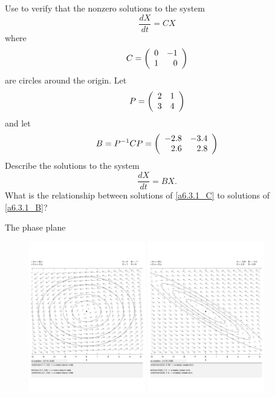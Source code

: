 \documentclass{ximera}
\begin{document}
\begin{exercise} \label{a6.3.1}
Use {\pplane} to verify that the nonzero solutions to the system
\[
\frac{dX}{dt} = CX
\]
where
\begin{equation} \label{a6.3.1_C}
C = \left(\begin{array}{rrrrrrrrrrrrrrrrrr} 0 & -1\\ 1 & 0 \end{array}\right)
\end{equation}
are circles around the origin.  Let 
\[
P = \left(\begin{array}{rrrrrrrrrrrrrrrrrr} 2 & 1\\ 3 & 4 \end{array}\right)
\]
and  let 
\[
B = P^{-1}CP =  \left(\begin{array}{rrrrrrrrrrrrrrrrrr} -2.8 & -3.4\\ 2.6 & 2.8 \end{array}\right)
\]
Describe the solutions to the system
\begin{equation} \label{a6.3.1_B}
\frac{dX}{dt} = BX.
\end{equation}
What is the relationship between solutions of \eqref{a6.3.1_C} to solutions of \eqref{a6.3.1_B}?

\begin{solution}
\soln 

The phase plane 

\begin{figure}[htb]
                       \centerline{%
                       \includegraphics[width=2.0in]{exfigure/F_6_3_a.pdf}
                       \includegraphics[width=2.0in]{exfigure/F_6_3_b.pdf}}
\end{figure}

\end{solution}
\end{exercise}
\end{document}
